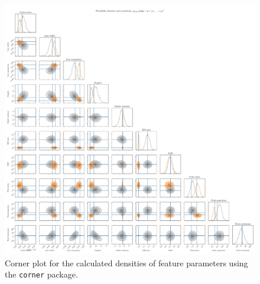 \documentclass[a4paper,12pt]{report}
\begin{document}

\begin{figure}[h!]
\centering
\includegraphics[width=\textwidth]{figures/nf-feature-extraction-example-3-corner.pdf}
\cprotect\caption{Corner plot for the calculated densities of feature parameters using the \verb|corner| package.}
\label{fig:nf-feature-extraction-example-3-corner}
\end{figure}
\end{document}
